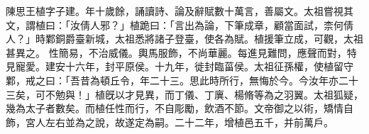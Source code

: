 
\begin{pinyinscope}

陳思王植字子建。年十歲餘，誦讀詩、論及辭賦數十萬言，善屬文。太祖嘗視其文，謂植曰：「汝倩人邪？」植跪曰：「言出為論，下筆成章，顧當面試，柰何倩人？」時鄴銅爵臺新城，太祖悉將諸子登臺，使各為賦。植援筆立成，可觀，太祖甚異之。
性簡易，不治威儀。輿馬服飾，不尚華麗。每進見難問，應聲而對，特見寵愛。建安十六年，封平原侯。十九年，徙封臨菑侯。太祖征孫權，使植留守鄴，戒之曰：「吾昔為頓丘令，年二十三。思此時所行，無悔於今。今汝年亦二十三矣，可不勉與！」植旣以才見異，而丁儀、丁廙、楊脩等為之羽翼。太祖狐疑，幾為太子者數矣。而植任性而行，不自彫勵，飲酒不節。文帝御之以術，矯情自飾，宮人左右並為之說，故遂定為嗣。二十二年，增植邑五千，并前萬戶。


\end{pinyinscope}
